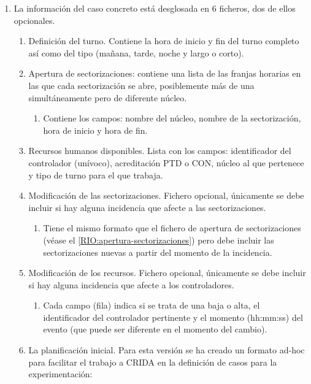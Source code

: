 \begin{enumerate}[label={\textbf{RIO\arabic*}}, ref={Requisito RIO\arabic*},  align=left]
	\item La información del caso concreto está desglosada en 6 ficheros, dos de ellos opcionales.
	\begin{enumerate}[label*={\textbf{.\arabic*}}, ref={\theenumi.\arabic*}]
		\item Definición del turno. Contiene la hora de inicio y fin del turno completo así como del tipo (mañana, tarde, noche y largo o corto).
		\item \label{RIO:apertura-sectorizaciones} Apertura de sectorizaciones: contiene una lista de las franjas horarias en las que cada sectorización se abre, posiblemente más de una simultáneamente pero de diferente núcleo.
		\begin{enumerate}[label*={\textbf{.\arabic*}}]
			\item Contiene los campos: nombre del núcleo, nombre de la sectorización, hora de inicio y hora de fin.
		\end{enumerate}
		\item \label{RIO:rrhh-disponibles}  Recursos humanos disponibles. Lista con los campos: identificador del controlador (unívoco), acreditación PTD o CON, núcleo al que pertenece y tipo de turno para el que trabaja.
		\item Modificación de las sectorizaciones. Fichero opcional, únicamente se debe incluir si hay alguna incidencia que afecte a las sectorizaciones.
		\begin{enumerate}[label*={\textbf{.\arabic*}}]
			\item Tiene el mismo formato que el fichero de apertura de sectorizaciones (véase el \ref{RIO:apertura-sectorizaciones}) pero debe incluir las sectorizaciones nuevas a partir del momento de la incidencia.
		\end{enumerate}
		\item Modificación de los recursos. Fichero opcional, únicamente se debe incluir si hay alguna incidencia que afecte a los controladores.
		\begin{enumerate}[label*={\textbf{.\arabic*}}]
			\item Cada campo (fila) indica si se trata de una baja o alta, el identificador del controlador pertinente y el momento (hh:mm:ss) del evento (que puede ser diferente en el momento del cambio).
		\end{enumerate}
		\item La planificación inicial. Para esta versión se ha creado un formato ad-hoc para facilitar el trabajo a \gls{CRIDA} en la definición de casos para la experimentación:

\end{enumerate}
\end{enumerate}
